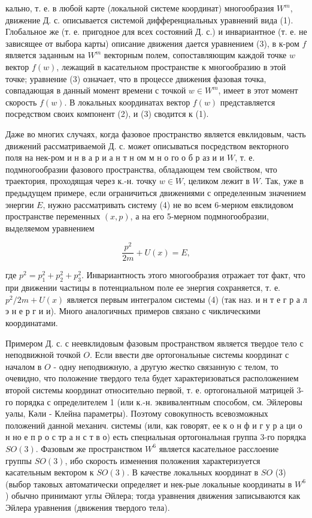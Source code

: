 \documentclass[10pt]{article}
\begin{document}
кально, т. е. в любой карте (локальной системе координат) многообразия $W^{m}$, движение Д. с. описывается системой дифференциальных уравнений вида (1). Глобальное же (т. е. пригодное для всех состояний Д. с.) и инвариантное (т. е. не зависящее от выбора карты) описание движения дается уравнением (3), в к-ром $f$ является заданным на $W^{m}$ векторным полем, сопоставляющим каждой точке $w$ вектор $f(w)$, лежащий в касательном пространстве к многообразию в этой точке; уравнение (3) означает, что в процессе движения фазовая точка, совпадающая в данный момент времени с точкой $w \in W^{m}$, имеет в этот момент скорость $f(w)$. В локальных координатах вектор $f(w)$ представляется посредством своих компонент (2), и (3) сводится к (1).



Даже во многих случаях, когда фазовое пространство является евклидовым, часть движений рассматриваемой Д. с. может описываться посредством векторного поля на нек-ром и н в а р и а н т н ом м н о го о б р аз и и $W$, т. е. подмногообразии фазового пространства, обладающем тем свойством, что траектория, проходящая через к.-н. точку $w \in W$, целиком лежит в $W$. Так, уже в предыдущем примере, если ограничиться движениями с определенным значением энергии $E$, нужно рассматривать систему (4) не во всем 6-мерном евклидовом пространстве переменных $(x, p)$, а на его 5-мерном подмногообразии, выделяемом уравнением



\[

\frac{p^{2}}{2 m}+U(x)=E,

\]



где $p^{2}=p_{1}^{2}+p_{2}^{2}+p_{3}^{2}$. Инвариантность этого многообразия отражает тот факт, что при движении частицы в потенциальном поле ее энергия сохраняется, т. е. $p^{2} / 2 m+U(x)$ является первым интегралом системы (4) (так наз. и н т е г р а л э н е р г и и). Много аналогичных примеров связано с чиклическими координатами.



Примером Д. с. с неевклидовым фазовым пространством является твердое тело с неподвижной точкой $O$. Если ввести две ортогональные системы координат с началом в $O$ - одну неподвижную, а другую жестко связанную с телом, то очевидно, что положение твердого тела будет характеризоваться расположением второй системы координат относительно первой, т. е. ортогональной матрицей 3-го порядка с определителем 1 (или к.-н. эквивалентным способом, см. Эйлеровы уәлы, Кә$л и$ - Клейна параметры). Поэтому совокупность всевозможных положений данной механич. системы (или, как говорят, ее к о н ф и г у р а ци о н но е п р о с тр а н с т в о) есть специальная ортогональная группа 3-го порядка $S O(3)$. Фазовым же пространством $W^{6}$ является касательное расслоение группы $S O(3)$, ибо скорость изменения положения характеризуется касательным вектором к $S O(3)$. В качестве локальных координат в $S O$ (3) (выбор таковых автоматически определяет и нек-рые локальные координаты в $W^{6}$ ) обычно принимают углы Әйлера; тогда уравнения движения записываются как Эйлера уравнения (движения твердого тела).
\end{document}
